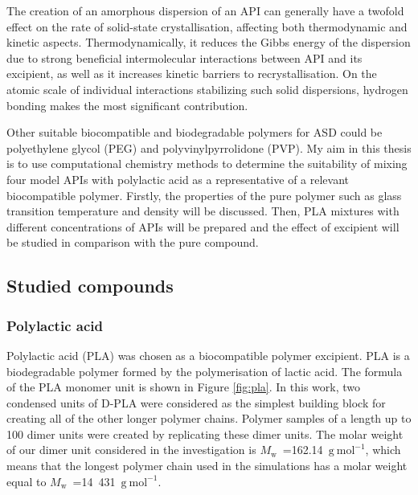 \newpage
The creation of an amorphous dispersion of an API can generally have a twofold effect on the rate of solid-state crystallisation, affecting both thermodynamic and kinetic aspects. Thermodynamically, it reduces the Gibbs energy of the dispersion due to strong beneficial intermolecular interactions between API and its excipient, as well as it increases kinetic barriers to recrystallisation. On the atomic scale of individual interactions stabilizing such solid dispersions, hydrogen bonding makes the most significant contribution. \cite{newman_what_2022}

Other suitable biocompatible and biodegradable polymers for ASD could be polyethylene glycol (PEG) and polyvinylpyrrolidone (PVP). \cite{klajmon_glass_2023} My aim in this thesis is to use computational chemistry methods to determine the suitability of mixing four model APIs with polylactic acid as a representative of a relevant biocompatible polymer. Firstly, the properties of the pure polymer such as glass transition temperature and density will be discussed. Then, PLA mixtures with different concentrations of APIs will be prepared and the effect of excipient will be studied in comparison with the pure compound.

\subsection{Studied compounds}
\subsubsection{Polylactic acid}
Polylactic acid (PLA) was chosen as a biocompatible polymer excipient.  PLA is a biodegradable polymer formed by the polymerisation of lactic acid. The formula of the PLA monomer unit is shown in Figure \ref{fig:pla}. In this work, two condensed units of D-PLA were considered as the simplest building block for creating all of the other longer polymer chains. Polymer samples of a length up to 100 dimer units were created by replicating these dimer units. The molar weight of our dimer unit considered in the investigation is $M_\mathrm{w}$~=162.14~$\mathrm{g\ mol^{-1}}$, which means that the longest polymer chain used in the simulations has a molar weight equal to  $M_\mathrm{w}$~=14~431~$\mathrm{g\ mol^{-1}}$.  

